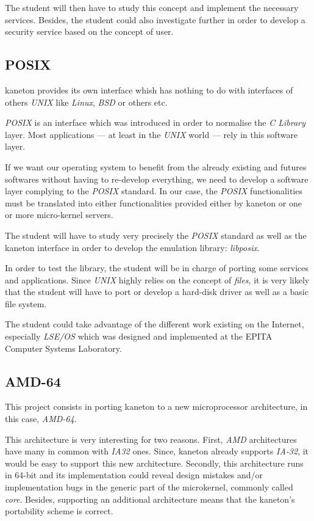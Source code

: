 \begin{multicols}{2}
The student will then have to study this concept and implement the necessary
services. Besides, the student could also investigate further in order
to develop a security service based on the concept of user.

%
%

\subsection{POSIX}

kaneton provides its own interface whish has nothing to do with interfaces
of others \textit{UNIX} like \textit{Linux}, \textit{BSD} or others etc.

\textit{POSIX} is an interface which was introduced in order to normalise the
\textit{C Library} layer. Most applications --- at least in the \textit{UNIX}
world --- rely in this software layer.

If we want our operating system to benefit from the already existing and
futures softwares without having to re-develop everything, we need to develop
a software layer complying to the \textit{POSIX} standard. In our case,
the \textit{POSIX} functionalities must be translated into either
functionalities provided either by kaneton or one or more micro-kernel
servers.

The student will have to study very precisely the \textit{POSIX} standard
as well as the kaneton interface in order to develop the emulation library:
\textit{libposix}.

In order to test the library, the student will be in charge of porting some
services and applications. Since \textit{UNIX} highly relies on the concept
of \textit{files}, it is very likely that the student will have to port
or develop a hard-disk driver as well as a basic file system.

The student could take advantage of the different work existing on the
Internet, especially \textit{LSE/OS} which was designed and implemented
at the EPITA Computer Systems Laboratory.

%
%

\subsection{AMD-64}

This project consists in porting kaneton to a new microprocessor architecture,
in this case, \textit{AMD-64}.

This architecture is very interesting for two reasons. First, \textit{AMD}
architectures have many in common with \textit{IA32} ones. Since, kaneton
already supports \textit{IA-32}, it would be easy to support this new
architecture. Secondly, this architecture runs in 64-bit and its implementation
could reveal design mistakes and/or implementation bugs in the generic
part of the microkernel, commonly called \textit{core}. Besides, supporting
an additional architecture means that the kaneton's portability scheme
is correct.


\end{multicols}
